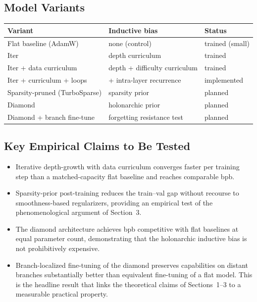 \documentclass[11pt,a4paper]{article}
\begin{document}
\subsection*{Model Variants}

\begin{center}
\begin{tabular}{lll}
\hline
\textbf{Variant} & \textbf{Inductive bias} & \textbf{Status} \\
\hline
Flat baseline (AdamW)           & none (control)                 & trained (small) \\
Iter                            & depth curriculum               & trained \\
Iter + data curriculum          & depth + difficulty curriculum  & trained \\
Iter + curriculum + loops       & + intra-layer recurrence       & implemented \\
Sparsity-pruned (TurboSparse)   & sparsity prior                 & planned \\
Diamond                         & holonarchic prior              & planned \\
Diamond + branch fine-tune      & forgetting resistance test     & planned \\
\hline
\end{tabular}
\end{center}

\subsection*{Key Empirical Claims to Be Tested}

\begin{itemize}
  \item Iterative depth-growth with data curriculum converges faster per training step
        than a matched-capacity flat baseline and reaches comparable bpb.
  \item Sparsity-prior post-training reduces the train--val gap without recourse to
        smoothness-based regularizers, providing an empirical test of the
        phenomenological argument of Section~3.
  \item The diamond architecture achieves bpb competitive with flat baselines at equal
        parameter count, demonstrating that the holonarchic inductive bias is not
        prohibitively expensive.
  \item Branch-localized fine-tuning of the diamond preserves capabilities on distant
        branches substantially better than equivalent fine-tuning of a flat model.
        This is the headline result that links the theoretical claims of
        Sections~1--3 to a measurable practical property.
\end{itemize}
\end{document}

